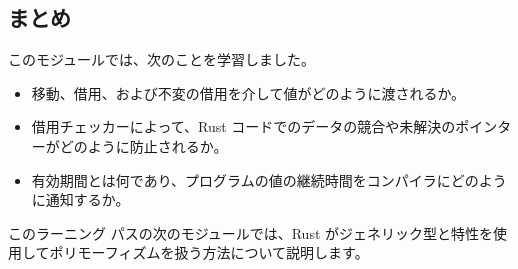 \subsection{まとめ}

このモジュールでは、次のことを学習しました。

\begin{itemize}
\item 移動、借用、および不変の借用を介して値がどのように渡されるか。
\item 借用チェッカーによって、Rust コードでのデータの競合や未解決のポインターがどのように防止されるか。
\item 有効期間とは何であり、プログラムの値の継続時間をコンパイラにどのように通知するか。
\end{itemize}


このラーニング パスの次のモジュールでは、Rust がジェネリック型と特性を使用してポリモーフィズムを扱う方法について説明します。

